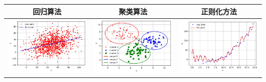 \begin{longtable}[]{ccc}
  \label{fig:2.5.2}
\toprule
回归算法 & 聚类算法 & 正则化方法
\tabularnewline
\midrule
\endhead
\begin{minipage}{0.1\linewidth}
  \includegraphics[width=1.0\linewidth]{./img/ch2/sec1/1.jpg}
\end{minipage}
&
\begin{minipage}{0.1\linewidth}
\includegraphics[width=1.0\linewidth]{./img/ch2/sec1/2.jpg}  
\end{minipage}
&
\begin{minipage}{0.1\linewidth}
\includegraphics[width=1.0\linewidth]{./img/ch2/sec1/3.jpg}

\end{minipage}
\end{longtable}
